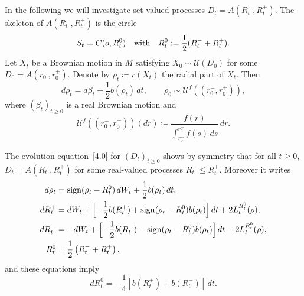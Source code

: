 \documentclass[JEP,XML,SOM,Unicode,NoFloatCountersInSection,published]{cedram}
\theoremstyle{plain}
\theoremstyle{definition}
\newcommand{\SU}{{\mathscr U}}
\newcommand\df{\coloneqq}
\newcommand{\sign}{\mathrm{sign}}
\let\f\frac
\let\b\beta
\begin{document}
In the following we will investigate set-valued processes $D_t=A(R_t^-, R_t^+)$.
The skeleton of $A(R_t^-,R_t^+)$ is the circle
\begin{equation}
S_t=C(o,R_t^0)\quad \hbox{with}\quad R_t^0:=\f12(R_t^-+R_t^+).
\end{equation}
Let $X_t$ be a Brownian motion in $M$ satisfying $X_0\sim \SU(D_0)$ for some $D_0=A(r_0^-,r_0^+)$. Denote by $\rho_t\df r(X_t)$ the radial part of $X_t$. Then
\begin{equation}
d\rho_t=d\b_t+\f12 b(\rho_t)\,dt, \qquad \rho_0\sim \SU^f((r_0^-,r_0^+)),
\end{equation}
where $(\b_t)_{t\ge0}$ is a real Brownian motion and
\begin{equation}
\SU^f((r_0^-,r_0^+))(dr)\df \f{f(r)}{\int_{r_0^-}^{r_0^+}f(s)\,ds}\,dr.
\end{equation}

The evolution equation~\eqref{4.0} for $(D_t)_{t\ge0}$ shows by symmetry that for all $t\ge 0$, $D_t=A(R_t^-,R_t^+)$ for some real-valued processes $R_t^-\le R_t^+$. Moreover it writes
\begin{equation}
\label{5.3.7}
\begin{split}
d\rho_t&=\sign(\rho_t-R_t^0)\,dW_t+\f12 b(\rho_t)\,dt,\\
dR_t^+&= dW_t+\Bigl[-\f12 b(R_t^+)+\sign(\rho_t-R_t^0)b(\rho_t)\Bigr]\,dt +2L_t^{R_t^0}(\rho),\\
dR_t^-&= -dW_t+\Bigl[-\f12 b(R_t^-)-\sign(\rho_t-R_t^0)b(\rho_t)\Bigr]\,dt -2L_t^{R_t^0}(\rho),\\
R_t^0&=\f12\left(R_t^-+R_t^+\right),
\end{split}
\end{equation}
and these equations imply
\begin{equation}
dR_t^0=-\f14\left[b(R_t^+)+b(R_t^-)\right]\,dt.
\end{equation}
\end{document}
